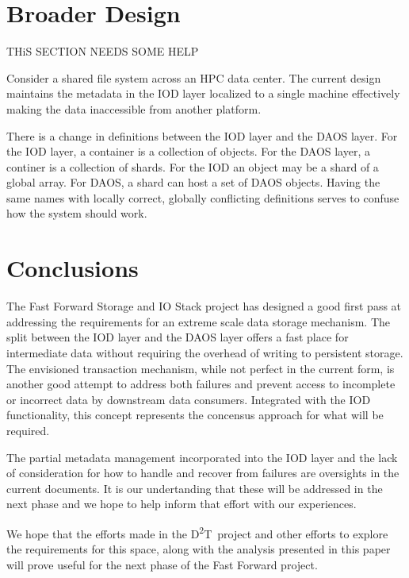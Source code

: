 \documentclass[conference]{sig-alt-gov2}
\newcommand{\DDT}{D\textsuperscript{2}T~}
\begin{document}
\section{Broader Design}
\label{sec:summary}

THiS SECTION NEEDS SOME HELP

Consider a shared file system across an HPC data center. The current design
maintains the metadata in the IOD layer localized to a single machine
effectively making the data inaccessible from another platform.

There is a change in definitions between the IOD layer and the DAOS layer.
For the IOD layer, a container is a collection of objects. For the DAOS layer,
a continer is a collection of shards. For the IOD an object may be a shard of
a global array. For DAOS, a shard can host a set of DAOS objects. Having the
same names with locally correct, globally conflicting definitions serves to
confuse how the system should work.

\section{Conclusions}
\label{sec:conclusion}

The Fast Forward Storage and IO Stack project has designed a good first pass at
addressing the requirements for an extreme scale data storage mechanism. The
split between the IOD layer and the DAOS layer offers a fast place for
intermediate data without requiring the overhead of writing to persistent
storage. The envisioned transaction mechanism, while not perfect in the current
form, is another good attempt to address both failures and prevent access to
incomplete or incorrect data by downstream data consumers. Integrated with the
IOD functionality, this concept represents the concensus approach for what will
be required.

The partial metadata management incorporated into the IOD layer and the lack of
consideration for how to handle and recover from failures are oversights in the
current documents. It is our undertanding that these will be addressed in the
next phase and we hope to help inform that effort with our experiences.

We hope that the efforts made in the \DDT project and other efforts to explore
the requirements for this space, along with the analysis presented in this
paper will prove useful for the next phase of the Fast Forward project.
\end{document}
